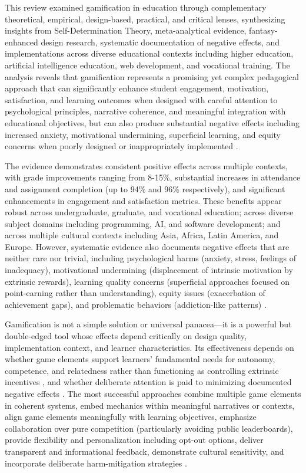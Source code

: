 \documentclass[12pt,a4paper]{article}
\begin{document}
This review examined gamification in education through complementary theoretical, empirical, design-based, practical, and critical lenses, synthesizing insights from Self-Determination Theory, meta-analytical evidence, fantasy-enhanced design research, systematic documentation of negative effects, and implementations across diverse educational contexts including higher education, artificial intelligence education, web development, and vocational training. The analysis reveals that gamification represents a promising yet complex pedagogical approach that can significantly enhance student engagement, motivation, satisfaction, and learning outcomes when designed with careful attention to psychological principles, narrative coherence, and meaningful integration with educational objectives, but can also produce substantial negative effects including increased anxiety, motivational undermining, superficial learning, and equity concerns when poorly designed or inappropriately implemented \parencite{ryan2025,wu2024,rodriguez2025,toda2022,dahri2024,ojonuba2023,wang2023,sevilla2024,surendeleg2024}.

The evidence demonstrates consistent positive effects across multiple contexts, with grade improvements ranging from 8-15\%, substantial increases in attendance and assignment completion (up to 94\% and 96\% respectively), and significant enhancements in engagement and satisfaction metrics. These benefits appear robust across undergraduate, graduate, and vocational education; across diverse subject domains including programming, AI, and software development; and across multiple cultural contexts including Asia, Africa, Latin America, and Europe. However, systematic evidence also documents negative effects that are neither rare nor trivial, including psychological harms (anxiety, stress, feelings of inadequacy), motivational undermining (displacement of intrinsic motivation by extrinsic rewards), learning quality concerns (superficial approaches focused on point-earning rather than understanding), equity issues (exacerbation of achievement gaps), and problematic behaviors (addiction-like patterns) \parencite{surendeleg2024}.

Gamification is not a simple solution or universal panacea—it is a powerful but double-edged tool whose effects depend critically on design quality, implementation context, and learner characteristics. Its effectiveness depends on whether game elements support learners' fundamental needs for autonomy, competence, and relatedness rather than functioning as controlling extrinsic incentives \parencite{ryan2025}, and whether deliberate attention is paid to minimizing documented negative effects \parencite{surendeleg2024}. The most successful approaches combine multiple game elements in coherent systems, embed mechanics within meaningful narratives or contexts, align game elements meaningfully with learning objectives, emphasize collaboration over pure competition (particularly avoiding public leaderboards), provide flexibility and personalization including opt-out options, deliver transparent and informational feedback, demonstrate cultural sensitivity, and incorporate deliberate harm-mitigation strategies \parencite{ryan2025,wu2024,rodriguez2025,toda2022,sevilla2024,surendeleg2024}.
\end{document}
